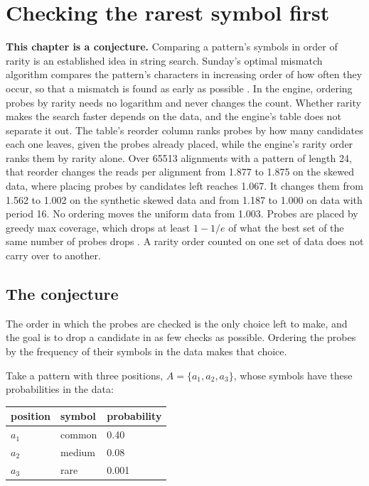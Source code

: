 \chapter{Checking the rarest symbol first}

\noindent\textbf{This chapter is a conjecture.} Comparing a pattern's symbols in order of rarity is an established idea in string search. Sunday's optimal mismatch algorithm compares the pattern's characters in increasing order of how often they occur, so that a mismatch is found as early as possible \cite{src:Sunday-1990}. In the engine, ordering probes by rarity needs no logarithm and never changes the count. Whether rarity makes the search faster depends on the data, and the engine's table does not separate it out. The table's reorder column ranks probes by how many candidates each one leaves, given the probes already placed, while the engine's rarity order ranks them by rarity alone. Over 65513 alignments with a pattern of length 24, that reorder changes the reads per alignment from 1.877 to 1.875 on the skewed data, where placing probes by candidates left reaches 1.067. It changes them from 1.562 to 1.002 on the synthetic skewed data and from 1.187 to 1.000 on data with period 16. No ordering moves the uniform data from 1.003. Probes are placed by greedy max coverage, which drops at least \(1 - 1/e\) of what the best set of the same number of probes drops \cite{src:Nemhauser-Wolsey-and-Fisher}. A rarity order counted on one set of data does not carry over to another.

\section{The conjecture}

The order in which the probes are checked is the only choice left to make, and the goal is to drop a candidate in as few checks as possible. Ordering the probes by the frequency of their symbols in the data makes that choice.

Take a pattern with three positions, \(A = \{a_1, a_2, a_3\}\), whose symbols have these probabilities in the data:

\begin{center}
\begin{tabular}{lll}
\toprule
position & symbol & probability \\
\midrule
\(a_1\) & common & 0.40 \\
\(a_2\) & medium & 0.08 \\
\(a_3\) & rare & 0.001 \\
\bottomrule
\end{tabular}
\end{center}

